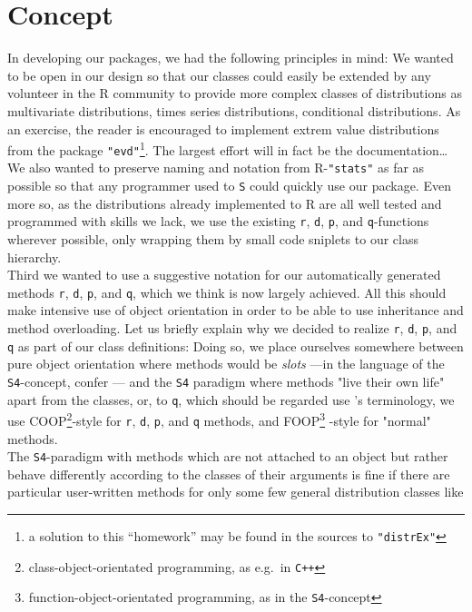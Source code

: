 \documentclass[11pt]{article}
\newcommand{\code}[1]{{\tt #1}}
\newcommand{\pkg}[1]{{\tt "#1"}}
\begin{document}
\section{Concept}
In developing our packages, we had the following principles in mind:
We wanted to be open in our design so that our classes could easily be extended by 
any volunteer in the {\sf R} community to provide more complex classes of 
distributions as multivariate distributions, times series distributions, conditional
distributions. As an exercise, the reader is encouraged to implement extrem value  distributions from the package \pkg{evd}\footnote{a solution to this ``homework'' 
may be found in the sources to \pkg{distrEx}}. The largest effort will in fact be the 
documentation\ldots\\
We also wanted to preserve naming and notation from {\sf R}-\pkg{stats}
as far as possible so that any programmer used to {\tt S} could quickly
use our package. Even more so, as the distributions already implemented to
{\sf R} are all well tested and programmed with skills we lack, we use the
existing {\tt r}, {\tt d}, {\tt p}, and {\tt q}-functions wherever possible,
only wrapping them by small code sniplets to our class hierarchy.\\
Third we wanted to use a suggestive notation for our automatically generated
methods \code{r}, \code{d}, \code{p}, and \code{q}, which we think is now largely achieved.
All this should make intensive use of object orientation in order to be able to use 
inheritance and method overloading.
Let us briefly explain why we decided to realize \code{r}, \code{d},
\code{p}, and \code{q} as part of our class definitions:
Doing so, we place ourselves somewhere between
pure object orientation where methods would be {\it slots\/} ---in the language of the {\tt S4}-concept,
confer \cite{Cham:98}--- and the {\tt S4} paradigm where methods "live their own life"
apart from the classes, or, to \code{q}, which should be regarded use 
\cite{Beng:03}'s terminology, we use COOP\footnote{class-object-orientated 
programming, as e.g.\ in {\tt C++}}-style for \code{r}, \code{d}, \code{p}, and 
\code{q} methods, and FOOP\footnote{function-object-orientated programming, 
as in the {\tt S4}-concept} -style for "normal" methods.\\
The {\tt S4}-paradigm with methods which are not attached to an object but rather 
behave differently according to the classes of their arguments is fine if there are
particular user-written methods for only some few general distribution classes like 
\end{document}
